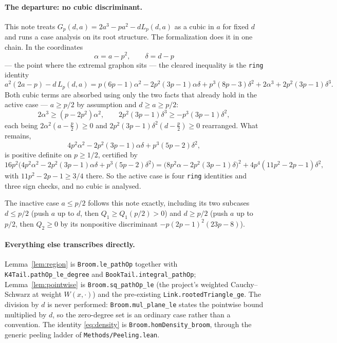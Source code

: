 \documentclass[11pt]{article}
\begin{document}
\paragraph{The departure: no cubic discriminant.}
This note treats $G_p(d,a)=2a^3-pa^2-dL_p(d,a)$ as a cubic in $a$ for fixed $d$
and runs a case analysis on its root structure.  The formalization does it in
one chain.  In the coordinates
\[
 \alpha=a-p^2,\qquad \delta=d-p
\]
--- the point where the extremal graphon sits --- the cleared inequality is the
\texttt{ring} identity
\begin{equation}
 a^2(2a-p)-d\,L_p(d,a)
 =p(6p-1)\alpha^2-2p^2(3p-1)\alpha\delta+p^3(8p-3)\delta^2
 +2\alpha^3+2p^2(3p-1)\delta^3 .
 \label{eq:lean-broom}
\end{equation}
Both cubic terms are absorbed using only the two facts that already hold in the
active case --- $a\geq p/2$ by assumption and $d\geq a\geq p/2$:
\[
 2\alpha^3\geq(p-2p^2)\alpha^2,
 \qquad
 2p^2(3p-1)\delta^3\geq-p^3(3p-1)\delta^2 ,
\]
each being $2\alpha^2(a-\frac p2)\geq0$ and
$2p^2(3p-1)\delta^2(d-\frac p2)\geq0$ rearranged.  What remains,
\[
 4p^2\alpha^2-2p^2(3p-1)\alpha\delta+p^3(5p-2)\delta^2 ,
\]
is positive definite on $p\geq1/2$, certified by
\begin{equation}
 16p^2\bigl(4p^2\alpha^2-2p^2(3p-1)\alpha\delta+p^3(5p-2)\delta^2\bigr)
 =\bigl(8p^2\alpha-2p^2(3p-1)\delta\bigr)^2+4p^4(11p^2-2p-1)\delta^2,
 \label{eq:lean-broom-pd}
\end{equation}
with $11p^2-2p-1\geq3/4$ there.  So the active case is four \texttt{ring}
identities and three sign checks, and no cubic is analysed.

The inactive case $a\leq p/2$ follows this note exactly, including its two
subcases $d\leq p/2$ (push $a$ up to $d$, then $Q_1\geq Q_1(p/2)>0$) and
$d\geq p/2$ (push $a$ up to $p/2$, then $Q_2\geq0$ by its nonpositive
discriminant $-p(2p-1)^2(23p-8)$).

\paragraph{Everything else transcribes directly.}
Lemma~\ref{lem:region} is \texttt{Broom.le\_pathOp} together with
\texttt{K4Tail.pathOp\_le\_degree} and \texttt{BookTail.integral\_pathOp};
Lemma~\ref{lem:pointwise} is \texttt{Broom.sq\_pathOp\_le} (the project's
weighted Cauchy--Schwarz at weight $W(x,\cdot)$) and the pre-existing
\texttt{Link.rooted\-Triangle\_ge}.  The division by $d$ is never performed:
\texttt{Broom.mul\_plane\_le} states the pointwise bound multiplied by $d$, so
the zero-degree set is an ordinary case rather than a convention.  The
identity \eqref{eq:density} is \texttt{Broom.homDensity\_broom}, through the
generic peeling ladder of \texttt{Methods/Peeling.lean}.
\end{document}

